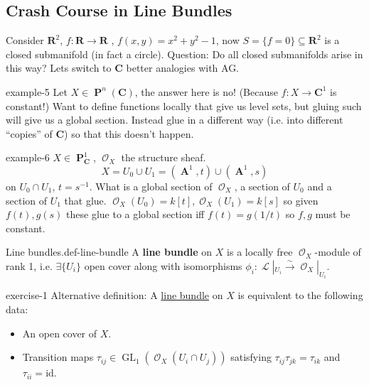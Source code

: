 \documentclass[10pt,]{book}
\newcommand{\terminology}[1]{\textbf{#1}}
\numberwithin{equation}{section}
\newcommand{\sheaf}[1]{\operatorname{\mathcal{#1}}}
\newcommand{\RR}{\mathbf{R}}
\newcommand{\CC}{\mathbf{C}}
\newcommand{\id}{\mathrm{id}}
\DeclareMathOperator{\aff}{\mathbf{A}}
\DeclareMathOperator{\PP}{\mathbf{P}}
\DeclareMathOperator{\GL}{GL}
\begin{document}
\subsection[{Crash Course in Line Bundles}]{Crash Course in Line Bundles}\label{sec-crash-course-line-bundles}
\hypertarget{p-107}{}%
Consider \(\RR^2\), \(f\colon \RR \to \RR\) , \(f(x,y) = x^2 + y^2 -1\), now \(S = \{f=0\}\subseteq \RR^2\) is a closed submanifold (in fact a circle). Question: Do all closed submanifolds arise in this way? Lets switch to \(\CC\) better analogies with AG.%
\begin{example}{}{example-5}%
\hypertarget{p-108}{}%
Let \(X\in \PP^n(\CC)\), the answer here is no! (Because \(f\colon X \to \CC^1\) is constant!) Want to define functions locally that give us level sets, but gluing such will give us a global section. Instead glue in a different way (i.e. into different ``copies'' of \(\CC\)) so that this doesn't happen.%
\end{example}
\begin{example}{}{example-6}%
\hypertarget{p-109}{}%
\(X\in \PP_\CC^1\), \(\sheaf O_X\) the structure sheaf.%
\begin{equation*}
X = U_0 \cup U_1 = (\aff^1,t) \cup(\aff^1,s)
\end{equation*}
on \(U_0\cap U_1\), \(t = s^{-1}\). What is a global section of \(\sheaf O_X\), a section of \(U_0\) and a section of \(U_1\) that glue. \(\sheaf O_X(U_0) =  k[t], \sheaf O_X(U_1) =  k[s]\) so given \(f(t), g(s)\) these glue to a global section iff \(f(t) = g(1/t)\) so \(f,g\) must be constant.%
\end{example}
\begin{definition}{Line bundles.}{def-line-bundle}%
\hypertarget{p-110}{}%
A \terminology{line bundle} on \(X\) is a locally free \(\sheaf O_X\)-module of rank 1, i.e. \(\exists \{U_i\}\) open cover along with isomorphisms \(\phi_i\colon \sheaf L|_{U_i} \xrightarrow\sim \sheaf O_X |_{U_i}\).%
\end{definition}
\begin{inlineexercise}{}{exercise-1}%
\hypertarget{p-111}{}%
Alternative definition: A \hyperref[def-line-bundle]{line bundle} on \(X\) is equivalent to the following data:\leavevmode%
\begin{itemize}[label=\textbullet]
\item{}An open cover of \(X\).%
\item{}Transition maps \(\tau_{ij} \in \GL_1(\sheaf O_X(U_i\cap U_j))\) satisfying \(\tau_{ij}\tau_{jk} =\tau_{ik}\) and \(\tau_{ii} = \id\).%
\end{itemize}
%
\end{inlineexercise}
\end{document}
